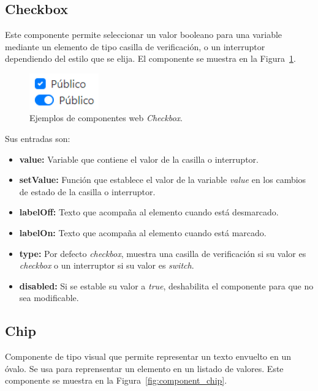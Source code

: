 \documentclass[a4paper, 12pt]{book}
\begin{document}
    \subsection{Checkbox}
    \label{subsec:wc_checkbox}
    Este componente permite seleccionar un valor booleano para una variable mediante un elemento de tipo casilla de verificación, o un interruptor dependiendo del estilo que se elija.
    El componente se muestra en la Figura~\ref{fig:component_checkbox}.

    \begin{figure}
        \centering
        \includegraphics[width=3cm, keepaspectratio]{img/Checkbox.PNG}
        \caption{Ejemplos de componentes web \emph{Checkbox}.}\label{fig:component_checkbox}
    \end{figure}

    Sus entradas son:

    \begin{itemize}
        \item \textbf{value:} Variable que contiene el valor de la casilla o interruptor.
        \item \textbf{setValue:} Función que establece el valor de la variable \emph{value} en los cambios de estado de la casilla o interruptor.
        \item \textbf{labelOff:} Texto que acompaña al elemento cuando está desmarcado.
        \item \textbf{labelOn:} Texto que acompaña al elemento cuando está marcado.
        \item \textbf{type:} Por defecto \emph{checkbox}, muestra una casilla de verificación si su valor es \emph{checkbox} o un interruptor si su valor es \emph{switch}.
        \item \textbf{disabled:} Si se estable su valor a \emph{true}, deshabilita el componente para que no sea modificable.
    \end{itemize}

    \subsection{Chip}
    \label{subsec:wc_chip}
    Componente de tipo visual que permite representar un texto envuelto en un óvalo. Se usa para reprensentar un elemento en un listado de valores.
    Este componente se muestra en la Figura~\ref{fig:component_chip}.
\end{document}
